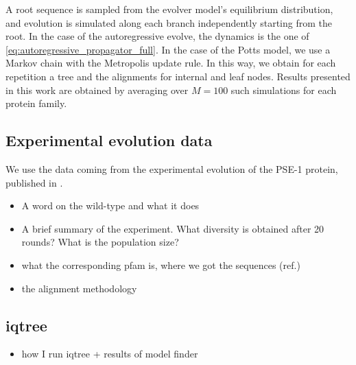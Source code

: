 A root sequence is sampled from the evolver model's equilibrium distribution, and evolution is simulated along each branch independently starting from the root. 
In the case of the autoregressive evolve, the dynamics is the one of \eqref{eq:autoregressive_propagator_full}. 
In the case of the Potts model, we use a Markov chain with the Metropolis update rule. 
In this way, we obtain for each repetition a tree and the alignments for internal and leaf nodes. 
Results presented in this work are obtained by averaging over $M=100$ such simulations for each protein family. 

\subsection{Experimental evolution data}

We use the data coming from the experimental evolution of the PSE-1 protein, published in \cite{stiffler_proteinstructureexperimental_2020}. 

\begin{itemize}
	\item A word on the wild-type and what it does
	\item A brief summary of the experiment. What diversity is obtained after 20 rounds? What is the population size?
	\item what the corresponding pfam is, where we got the sequences (ref.)
	\item the alignment methodology
\end{itemize}

\subsection{iqtree}

\begin{itemize}
	\item how I run iqtree + results of model finder
\end{itemize}

